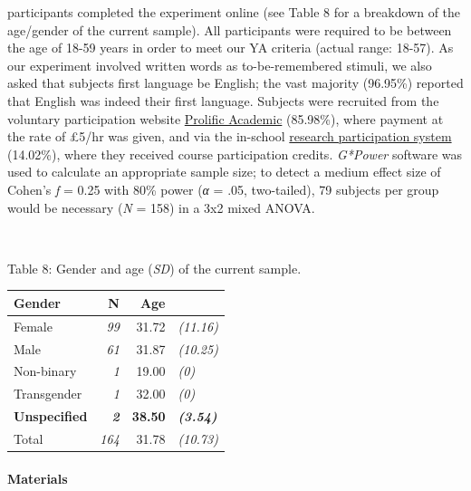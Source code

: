 \documentclass[
  11pt,
]{article}
\begin{document}
\hfill{} participants completed the experiment online (see Table
8 for a breakdown of the age/gender of the current sample). All
participants were required to be between the age of 18-59 years in order
to meet our YA criteria (actual range: 18-57). As our experiment
involved written words as to-be-remembered stimuli, we also asked that
subjects first language be English; the vast majority (96.95\%) reported
that English was indeed their first language. Subjects were recruited
from the voluntary participation website
\href{https://www.prolific.co/}{Prolific Academic} (85.98\%), where
payment at the rate of £5/hr was given, and via the in-school
\href{https://keelepsychology.sona-systems.com/}{research participation system}
(14.02\%), where they received course participation credits.
\emph{G*Power} software was used to calculate an appropriate sample
size; to detect a medium effect size of Cohen's \emph{f} = 0.25 with
80\% power (\emph{α} = .05, two-tailed), 79 subjects per group would be
necessary (\emph{N} = 158) in a 3x2 mixed ANOVA.

~ ~

Table 8: Gender and age (\emph{SD}) of the current sample.

\begin{table}[!h]
\centering
\begin{tabular}{l>{}rr>{}l}
\toprule
Gender & N & Age &  \\
\midrule
Female & \em{99} & 31.72 & \em{(11.16)}\\
Male & \em{61} & 31.87 & \em{(10.25)}\\
Non-binary & \em{1} & 19.00 & \em{(0)}\\
Transgender & \em{1} & 32.00 & \em{(0)}\\
\textbf{Unspecified} & \textbf{\em{2}} & \textbf{38.50} & \textbf{\em{(3.54)}}\\
\addlinespace
Total & \em{164} & 31.78 & \em{(10.73)}\\
\bottomrule
\end{tabular}
\end{table}

\hypertarget{materials-3}{%
\paragraph{Materials}\label{materials-3}}
\end{document}
